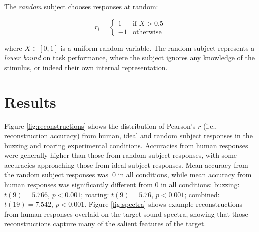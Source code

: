 \documentclass[journal]{IEEEtran}
\begin{document}
The \textit{random} subject chooses responses at random:

\begin{equation}
    r_i =
    \begin{cases}
        1 & \text{if  } X > 0.5 \\
        -1 & \text{otherwise}
    \end{cases}
\end{equation}

where $X \in [0, 1]$ is a uniform random variable.
The random subject represents a \textit{lower bound} on task performance,
where the subject ignores any knowledge of the stimulus, or indeed their own internal representation.

\section{Results}

Figure \ref{fig:reconstructions} shows the distribution of Pearson's $r$ (i.e., reconstruction accuracy) from human, ideal and random subject responses in the buzzing and roaring experimental conditions.
Accuracies from human responses were generally higher than those from random subject responses,
with some accuracies approaching those from ideal subject responses.
Mean accuracy from the random subject responses was $~0$ in all conditions,
while mean accuracy from human responses was significantly different from $0$ in all conditions: buzzing: $t(9) = 5.766$, $p < 0.001$; roaring: $t(9) = 5.76$, $p < 0.001$; combined: $t(19) = 7.542$, $p < 0.001$.
Figure \ref{fig:spectra} shows example reconstructions from human responses overlaid on the target sound spectra,
showing that those reconstructions capture many of the salient features of the target.
\end{document}
